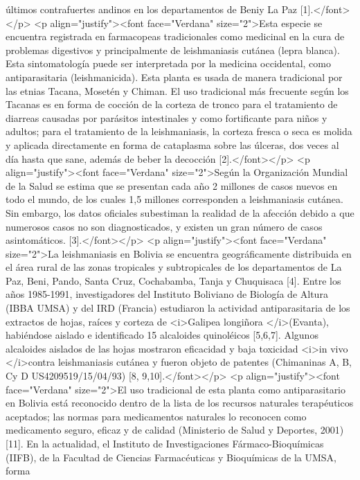 últimos contrafuertes andinos en los departamentos de Beniy La Paz
[1].</font></p> <p align="justify"><font face="Verdana" size="2">Esta especie se
encuentra registrada en farmacopeas tradicionales como medicinal en la cura de
problemas digestivos y principalmente de leishmaniasis cutánea (lepra blanca).
Esta sintomatología puede ser interpretada por la medicina occidental, como
antiparasitaria (leishmanicida). Esta planta es usada de manera tradicional por
las etnias Tacana, Mosetén y Chiman. El uso tradicional más frecuente según los
Tacanas es en forma de cocción de la corteza de tronco para el tratamiento de
diarreas causadas por parásitos intestinales y como fortificante para niños y
adultos; para el tratamiento de la leishmaniasis, la corteza fresca o seca es
molida y aplicada directamente en forma de cataplasma sobre las úlceras, dos
veces al día hasta que sane, además de beber la decocción [2].</font></p> <p
align="justify"><font face="Verdana" size="2">Según la Organización Mundial de
la Salud se estima que se presentan cada año 2 millones de casos nuevos en todo
el mundo, de los cuales 1,5 millones corresponden a leishmaniasis cutánea. Sin
embargo, los datos oficiales subestiman la realidad de la afección debido a que
numerosos casos no son diagnosticados, y existen un gran número de casos
asintomáticos. [3].</font></p> <p align="justify"><font face="Verdana"
size="2">La leishmaniasis en Bolivia se encuentra geográficamente distribuida en
el área rural de las zonas tropicales y subtropicales de los departamentos de La
Paz, Beni, Pando, Santa Cruz, Cochabamba, Tanja y Chuquisaca [4]. Entre los años
1985-1991, investigadores del Instituto Boliviano de Biología de Altura (IBBA
UMSA) y del IRD (Francia) estudiaron la actividad antiparasitaria de los
extractos de hojas, raíces y corteza de <i>Galipea longiñora </i>(Evanta),
habiéndose aislado e identificado 15 alcaloides quinoléicos [5,6,7]. Algunos
alcaloides aislados de las hojas mostraron eficacidad y baja toxicidad <i>in
vivo </i>contra leishmaniasis cutánea y fueron objeto de patentes (Chimaninas A,
B, Cy D US4209519/15/04/93) [8, 9,10].</font></p> <p align="justify"><font
face="Verdana" size="2">El uso tradicional de esta planta como antiparasitario
en Bolivia está reconocido dentro de la lista de los recursos naturales
terapéuticos aceptados; las normas para medicamentos naturales lo reconocen como
medicamento seguro, eficaz y de calidad (Ministerio de Salud y Deportes, 2001)
[11]. En la actualidad, el Instituto de Investigaciones Fármaco-Bioquímicas
(IIFB), de la Facultad de Ciencias Farmacéuticas y Bioquímicas de la UMSA, forma
